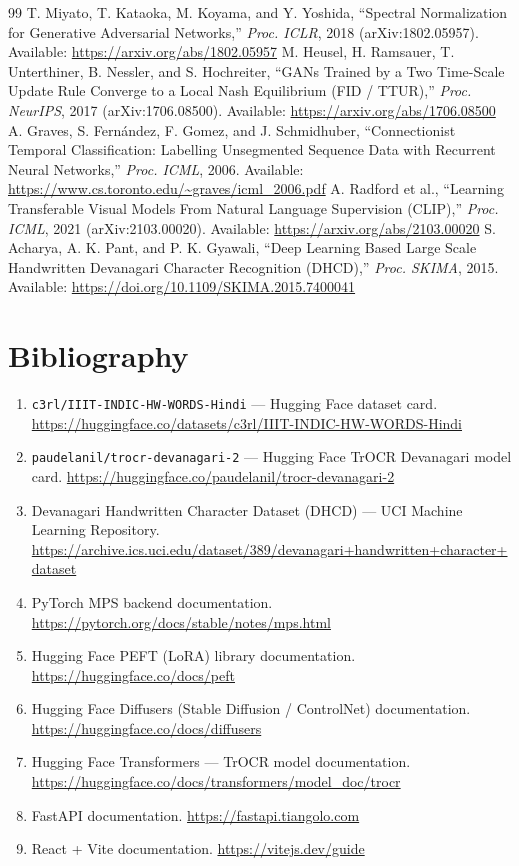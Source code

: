 \documentclass[12pt,a4paper]{report}
\begin{document}
\begin{thebibliography}{99}
 T. Miyato, T. Kataoka, M. Koyama, and Y. Yoshida, ``Spectral Normalization for Generative Adversarial Networks,'' \textit{Proc. ICLR}, 2018 (arXiv:1802.05957). Available: \url{https://arxiv.org/abs/1802.05957}
 M. Heusel, H. Ramsauer, T. Unterthiner, B. Nessler, and S. Hochreiter, ``GANs Trained by a Two Time-Scale Update Rule Converge to a Local Nash Equilibrium (FID / TTUR),'' \textit{Proc. NeurIPS}, 2017 (arXiv:1706.08500). Available: \url{https://arxiv.org/abs/1706.08500}
 A. Graves, S. Fern\'andez, F. Gomez, and J. Schmidhuber, ``Connectionist Temporal Classification: Labelling Unsegmented Sequence Data with Recurrent Neural Networks,'' \textit{Proc. ICML}, 2006. Available: \url{https://www.cs.toronto.edu/~graves/icml_2006.pdf}
 A. Radford et al., ``Learning Transferable Visual Models From Natural Language Supervision (CLIP),'' \textit{Proc. ICML}, 2021 (arXiv:2103.00020). Available: \url{https://arxiv.org/abs/2103.00020}
 S. Acharya, A. K. Pant, and P. K. Gyawali, ``Deep Learning Based Large Scale Handwritten Devanagari Character Recognition (DHCD),'' \textit{Proc. SKIMA}, 2015. Available: \url{https://doi.org/10.1109/SKIMA.2015.7400041}
\end{thebibliography}

\chapter*{Bibliography}
\begin{enumerate}[itemsep=2pt]
  \item \texttt{c3rl/IIIT-INDIC-HW-WORDS-Hindi} --- Hugging Face dataset card. \url{https://huggingface.co/datasets/c3rl/IIIT-INDIC-HW-WORDS-Hindi}
  \item \texttt{paudelanil/trocr-devanagari-2} --- Hugging Face TrOCR Devanagari model card. \url{https://huggingface.co/paudelanil/trocr-devanagari-2}
  \item Devanagari Handwritten Character Dataset (DHCD) --- UCI Machine Learning Repository. \url{https://archive.ics.uci.edu/dataset/389/devanagari+handwritten+character+dataset}
  \item PyTorch MPS backend documentation. \url{https://pytorch.org/docs/stable/notes/mps.html}
  \item Hugging Face PEFT (LoRA) library documentation. \url{https://huggingface.co/docs/peft}
  \item Hugging Face Diffusers (Stable Diffusion / ControlNet) documentation. \url{https://huggingface.co/docs/diffusers}
  \item Hugging Face Transformers --- TrOCR model documentation. \url{https://huggingface.co/docs/transformers/model_doc/trocr}
  \item FastAPI documentation. \url{https://fastapi.tiangolo.com}
  \item React + Vite documentation. \url{https://vitejs.dev/guide}
\end{enumerate}
\end{document}
